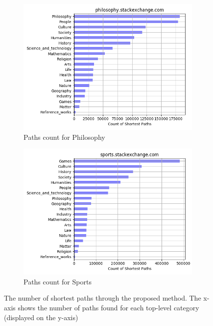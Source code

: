 \begin{figure}[H]
     \begin{subfigure}{0.5\textwidth}
    \centering
        \includegraphics[width=1\linewidth]{imgs/path-counts/philosophy_stackexchange_com}
        \caption{Paths count for Philosophy}
        \label{fig:path-count-philosophy}
    \end{subfigure}%
    \begin{subfigure}{0.5\textwidth}
    \centering
        \includegraphics[width=1\linewidth]{imgs/path-counts/sports_stackexchange_com}
        \caption{Paths count for Sports}
        \label{fig:path-count-sports}
    \end{subfigure}
   
 
    \caption{The number of shortest paths through the proposed method. The x-axis shows the number of paths found for each top-level category (displayed on the y-axis) }
    \label{fig:complete-path-count-distribution}
    
\end{figure}